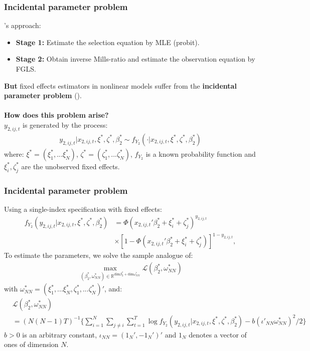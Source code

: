 \begin{frame}[label = Asymptotic]
    \frametitle{Incidental parameter problem}
    \cite{heckman1979sample}'s approach:
    \begin{itemize}
        \item \textbf{Stage 1:} Estimate the selection equation by MLE (probit).
        \item \textbf{Stage 2:} Obtain inverse Mills-ratio and estimate the observation equation by FGLS.
    \end{itemize} 
    \textbf{But} fixed effects estimators in nonlinear models suffer from the \textbf{incidental parameter problem} (\cite{neyman1948consistent}). 
    \\~\\
    \textbf{How does this problem arise?}\\
    $y_{2,ij,t}$ is generated by the process:
\begin{align*}
    y_{2,ij,t} \rvert x_{2,ij,t}, \xi^*, \zeta^*, \beta_2^* \sim f_{Y_2}(\cdot \rvert x_{2,ij,t}, \xi^*, \zeta^*, \beta_2^*)
\end{align*}
\noindent where: $\xi^* = (\xi_1^*, ... \xi_N^*)$, $\zeta^* = (\zeta_1^*, ... \zeta_N^*)$, $f_{Y_2}$ is a known probability function and $\xi^*_i, \zeta^*_j$ are the unobserved fixed effects.
\end{frame}

\begin{frame}
    \frametitle{Incidental parameter problem}
Using a single-index specification with fixed effects:
\begin{align}
    f_{Y_2} ( y_{2,ij,t} \rvert  x_{2,ij,t}, \xi^*, \zeta^*, \beta_2^*) &= \Phi(x_{2,ij,t}'{\beta_2^*}  +\xi_{i}^*+\zeta_{j}^*)^{y_{2,ij,t}} \nonumber\\ 
    &\times [1 - \Phi(x_{2,ij,t}'{\beta_2^*}  +\xi_{i}^*+\zeta_{j}^*)]^{1-y_{2,ij,t}}, 
    \label{eq:fy}
 \end{align}
 To estimate the parameters, we solve the sample analogue of:
\begin{align}
    \max_{(\beta_2^*, \omega_{NN}^*) \in \mathbb{R}^{\text{dim} \beta_2^* + \text{dim} \omega_{NN}^*}} \mathcal{L} (\beta_2^*, \omega_{NN}^*)
    \label{eq:val1}
\end{align}
\noindent with $\omega_{NN}^* = {(\xi_1^*, ... \xi_N^*, \zeta_1^*, ... \zeta_N^*)}'$, and:
\begin{align} \label{eq:unconditional}
    &\mathcal{L} (\beta_2^*, \omega_{NN}^*) \\ &= (N(N-1)T)^{-1} \Big\{ \sum_{i=1}^{N}\sum_{j\neq i}\sum_{t=1}^T \log f_{Y_2} ( y_{2,ij,t} \rvert  x_{2,ij,t}, \xi^*, \zeta^*, \beta_2^*) - b(\iota'_{NN} \omega_{NN}^*)^2/2 \Big\} \nonumber
\end{align}
\noindent $b>0$ is an arbitrary constant, $\iota_{NN} = (1_N', - 1_N')'$ and $1_N$ denotes a vector of ones of dimension $N$.
\end{frame}

